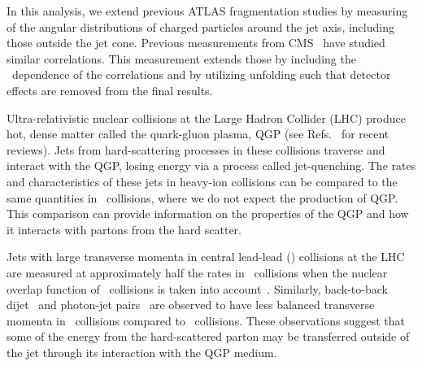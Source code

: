 In this analysis, we extend previous ATLAS fragmentation studies by measuring of the angular distributions of charged particles around the jet axis, including those outside the jet cone.
Previous measurements from CMS~\cite{Khachatryan:2016tfj,CMSPASHIN16020} have studied similar correlations.
This measurement extends those by including the \pTjet\ dependence of the correlations and by utilizing unfolding such that detector effects are removed from the final results.






Ultra-relativistic nuclear collisions at the Large Hadron Collider (LHC) produce hot, dense matter called the quark-gluon plasma, QGP (see Refs.~\cite{Roland:2014jsa,Busza:2018rrf} for recent reviews).
Jets from hard-scattering processes in these collisions traverse and interact with the QGP, losing energy via a process called jet-quenching.
The rates and characteristics of these jets in heavy-ion collisions can be compared to the same quantities in \pp\ collisions, where we do not expect the production of QGP.
This comparison can provide information on the properties of the QGP and how it interacts with partons from the hard scatter.

Jets with large transverse momenta in central lead-lead (\pbpb) collisions at the LHC are measured at approximately half the rates in \pp\ collisions when the nuclear overlap function of \pbpb\ collisions is taken into account~\cite{Abelev:2013kqa,Aad:2014bxa,Adam:2015ewa,Khachatryan:2016jfl, 2019108}.
Similarly, back-to-back dijet~\cite{Aad:2010bu,Chatrchyan:2011sx,Aaboud:2017eww} and photon-jet pairs~\cite{Chatrchyan:2012gt,Aaboud:2018anc} are observed to have less balanced transverse momenta in \pbpb\ collisions compared to \pp\ collisions.
These observations suggest that some of the energy from the hard-scattered parton may be transferred outside of the jet through its interaction with the QGP medium.
 
